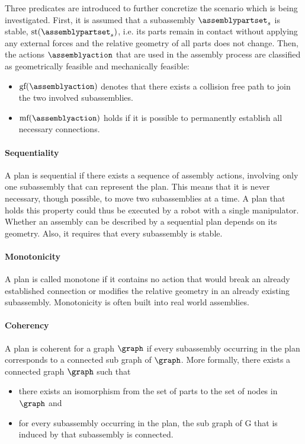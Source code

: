 Three predicates are introduced to further concretize the scenario which is being investigated.
First, it is assumed that a subassembly $\assemblypartset_s$ is stable, $\text{st}(\assemblypartset_s)$, i.e. its parts remain in contact without applying any external forces and the relative geometry of all parts does not change.
Then, the actions $\assemblyaction$ that are used in the assembly process are classified as geometrically feasible and mechanically feasible:
\begin{itemize}
\item $\text{gf}(\assemblyaction)$ denotes that there exists a collision free path to join the two involved subassemblies.
\item $\text{mf}(\assemblyaction)$ holds if it is possible to permanently establish all necessary connections.
\end{itemize}
\paragraph{Sequentiality}
A plan is sequential if there exists a sequence of assembly actions, involving only one subassembly that can represent the plan.
This means that it is never necessary, though possible, to move two subassemblies at a time.
A plan that holds this property could thus be executed by a robot with a single manipulator.
Whether an assembly can be described by a sequential plan depends on its geometry.
Also, it requires that every subassembly is stable.
\paragraph{Monotonicity}
A plan is called monotone if it contains no action that would break an already established connection or modifies the relative geometry in an already existing subassembly.
Monotonicity is often built into real world assemblies.
\paragraph{Coherency}
A plan is coherent for a graph $\graph$ if every subassembly occurring in the plan corresponds to a connected sub graph of $\graph$.
More formally, there exists a connected graph $\graph$ such that
\begin{itemize}
\item there exists an isomorphism from the set of parts to the set of nodes in $\graph$ and
\item for every subassembly occurring in the plan, the sub graph of G that is induced by that subassembly is connected.
\end{itemize}


